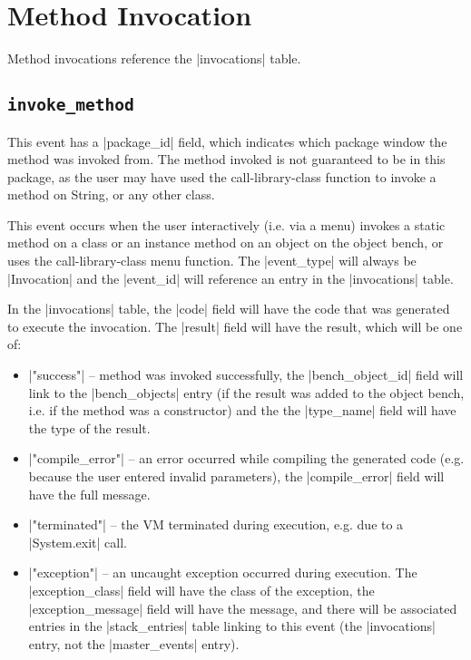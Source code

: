 \documentclass{book}
\begin{document}
\section{Method Invocation}

Method invocations reference the |invocations| table.


\subsection{\lstinline|invoke_method|}

This event has a |package_id| field, which indicates which package window the
method was invoked from.  The method invoked is not guaranteed to be in this
package, as the user may have used the call-library-class function to invoke a
method on String, or any other class.

This event occurs when the user interactively (i.e. via a menu) invokes a
static method on a class or an instance method on an object on the object
bench, or uses the call-library-class menu function.  The |event_type| will
always be |Invocation| and the |event_id| will reference an entry in the
|invocations| table.  

In the |invocations| table, the |code| field will have the code that was generated
to execute the invocation.  The |result| field will have the result, which will be one of:

\begin{itemize}
\item |"success"| -- method was invoked successfully, the |bench_object_id|
  field will link to the |bench_objects| entry (if the result was added to the
  object bench, i.e. if the method was a constructor) and the the |type_name|
  field will have the type of the result.
\item |"compile_error"| -- an error occurred while compiling the generated code
  (e.g. because the user entered invalid parameters), the |compile_error|
  field will have the full message.
\item |"terminated"| -- the VM terminated during execution, e.g. due to a
  |System.exit| call.
\item |"exception"| -- an uncaught exception occurred during execution.  The
  |exception_class| field will have the class of the exception, the
  |exception_message| field will have the message, and there will be
  associated entries in the |stack_entries| table linking to this event (the
  |invocations| entry, not the |master_events| entry).
\end{itemize}
\end{document}
